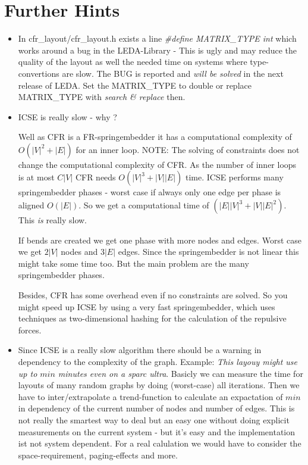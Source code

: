 \documentclass[notitlepage,fleqn]{article}
\begin{document}
\section{Further Hints}
{
  \begin{itemize}
    \item In cfr\_layout/cfr\_layout.h exists a line
      {\em \#define MATRIX\_TYPE int} which works around a bug in the
      LEDA-Library - This is ugly and may reduce the quality of the
      layout as well the needed time on systems where
      type-convertions are slow. The BUG is reported and 
      {\em will be solved} in the next release of LEDA. 
      Set the MATRIX\_TYPE to double or replace 
      MATRIX\_TYPE with {\em search \& replace} then.

      \item ICSE is really slow - why ?

        Well as CFR is a FR-springembedder it has a computational
        complexity of $O(|V|^2+|E|)$ for an inner loop. NOTE: The
        solving of constraints does not change the 
        computational complexity of CFR. As the number of inner loops
        is at most $C|V|$ CFR needs $O(|V|^3+|V||E|)$ time.
        ICSE performs many springembedder phases - worst case
        if always only one edge per phase is aligned $O(|E|)$.
        So we get a computational time of $(|E||V|^3 + |V||E|^2)$.
        This {\em is} really slow.

        If bends are created we get one phase with more nodes and
        edges. Worst case we get $2 |V|$ nodes and $3 |E|$ edges.
        Since the springembedder is not linear this might take some
        time too. But the main problem are the many springembedder phases.

        Besides, CFR has some overhead even if no constraints are solved.
        So you might speed up ICSE by using a very fast
        springembedder, which uses techniques as two-dimensional
        hashing for the calculation of the repulsive forces.

      \item Since ICSE is a really slow algorithm there should be a warning
        in dependency to the complexity of the graph. Example:
        {\em This layouy might use up to $min$ 
          minutes even on a sparc ultra}.
        Basicly we can measure the time for layouts of 
        many random graphs by doing (worst-case) all iterations.
        Then we have to inter/extrapolate a trend-function to
        calculate an expactation of $min$ in dependency of
        the current number of nodes and number of edges.
        This is not really the smartest way to deal but an easy
        one without doing explicit measurements on the current
        system - but it's easy and the implementation ist
        not system dependent. For a real calulation we would have
        to consider the space-requirement, paging-effects and more.


\end{itemize}}
\end{document}
